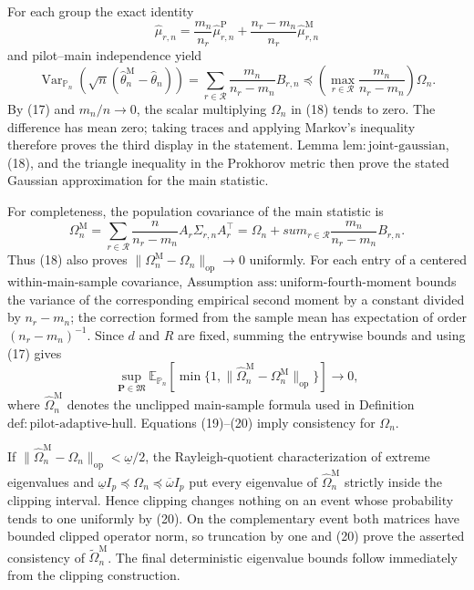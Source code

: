 For each group the exact identity
\[
 \widehat\mu_{r,n}
 =\frac{m_n}{n_r}\widehat\mu_{r,n}^{\mathrm P}
  +\frac{n_r-m_n}{n_r}\widehat\mu_{r,n}^{\mathrm M}
\]
and pilot--main independence yield
\[
 \operatorname{Var}_{\mathbb P_n}\!\left(
 \sqrt n(\widehat\theta_n^{\mathrm M}-\widehat\theta_n)
 \right)
 =\sum_{r\in\mathcal R}
   \frac{m_n}{n_r-m_n}B_{r,n}
 \preceq
 \left(\max_{r\in\mathcal R}\frac{m_n}{n_r-m_n}\right)\Omega_n.
\tag{18}
\]
By (17) and \(m_n/n\to0\), the scalar multiplying \(\Omega_n\) in (18) tends to zero.  The difference has mean zero; taking traces and applying Markov's inequality therefore proves the third display in the statement.  Lemma \(\mathrm{lem:joint\text{-}gaussian}\), (18), and the triangle inequality in the Prokhorov metric then prove the stated Gaussian approximation for the main statistic.

For completeness, the population covariance of the main statistic is
\[
 \Omega_n^{\mathrm M}
 =\sum_{r\in\mathcal R}\frac n{n_r-m_n}
   A_r\Sigma_{r,n}A_r^{\top}
 =\Omega_n+sum_{r\in\mathcal R}
   \frac{m_n}{n_r-m_n}B_{r,n}.
\tag{19}
\]
Thus (18) also proves \(\|\Omega_n^{\mathrm M}-\Omega_n\|_{\mathrm{op}}\to0\) uniformly.  For each entry of a centered within-main-sample covariance, Assumption \(\mathrm{ass:uniform\text{-}fourth\text{-}moment}\) bounds the variance of the corresponding empirical second moment by a constant divided by \(n_r-m_n\); the correction formed from the sample mean has expectation of order \((n_r-m_n)^{-1}\).  Since \(d\) and \(R\) are fixed, summing the entrywise bounds and using (17) gives
\[
 \sup_{\mathbf P\in\mathfrak M}
 \mathbb E_{\mathbb P_n}\!\left[
 \min\{1,\|\widehat\Omega_n^{\mathrm M}-\Omega_n^{\mathrm M}\|_{\mathrm{op}}\}
 \right]\longrightarrow0,
\tag{20}
\]
where \(\widehat\Omega_n^{\mathrm M}\) denotes the unclipped main-sample formula used in Definition \(\mathrm{def:pilot\text{-}adaptive\text{-}hull}\).  Equations (19)--(20) imply consistency for \(\Omega_n\).

If \(\|\widehat\Omega_n^{\mathrm M}-\Omega_n\|_{\mathrm{op}}<\underline\omega/2\), the Rayleigh-quotient characterization of extreme eigenvalues and \(\underline\omega I_p\preceq\Omega_n\preceq\overline\omega I_p\) put every eigenvalue of \(\widehat\Omega_n^{\mathrm M}\) strictly inside the clipping interval.  Hence clipping changes nothing on an event whose probability tends to one uniformly by (20).  On the complementary event both matrices have bounded clipped operator norm, so truncation by one and (20) prove the asserted consistency of \(\widetilde\Omega_n^{\mathrm M}\).  The final deterministic eigenvalue bounds follow immediately from the clipping construction.

